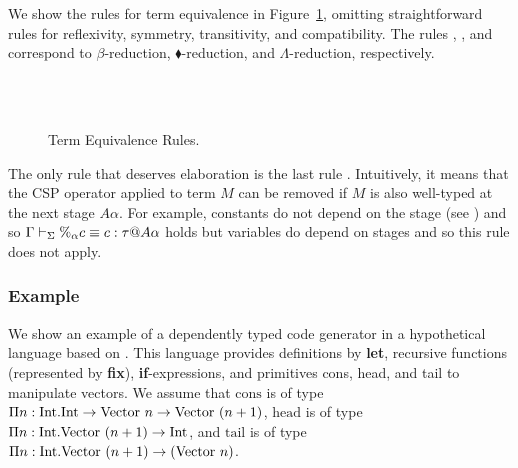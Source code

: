 We show the rules for term equivalence  in
Figure~\ref{fig:term-equivalence-rules}, omitting straightforward rules for
reflexivity, symmetry, transitivity, and compatibility.  The rules \QBeta,
\QTBLTB, and \QLambda{} correspond to $\beta$-reduction,
$\blacklozenge$-reduction, and $\Lambda$-reduction, respectively.

\begin{figure}[tbp]
    \begin{center}
    \\[2mm]
     \\[2mm]
     \hfil
    \caption{Term Equivalence Rules.}
    \label{fig:term-equivalence-rules}
  \end{center}
\end{figure}

The only rule that deserves elaboration is the last rule \QPercent.
Intuitively, it means that the CSP operator applied to term $M$ can be
removed if $M$ is also well-typed at the next stage \(A\alpha\).
For example, constants do not depend on the stage (see \TConst) and
so \(\Gamma\vdash_\Sigma \%_\alpha c \equiv c : \tau @ A\alpha\) holds but variables
do depend on stages and so this rule does not apply.

\subsubsection{Example}

We show an example of a dependently typed code generator in a
hypothetical language based on \LTP.  
This language provides definitions by \textbf{let},
recursive functions (represented by \textbf{fix}), \textbf{if}-expressions,
and primitives cons, head, and tail to manipulate vectors. We assume that
$\text{cons}$ is of type $\Pi n:\textrm{Int}.\textrm{Int} \to \text{Vector}\ n \to \text{Vector}\ (n+1)$, 
$\text{head}$ is of type $\Pi n:\textrm{Int}.\text{Vector}\ (n+1) \to \textrm{Int}$, and
$\text{tail}$ is of type $\Pi n:\textrm{Int}.\text{Vector}\ (n+1) \to (\text{Vector}\ n)$.

